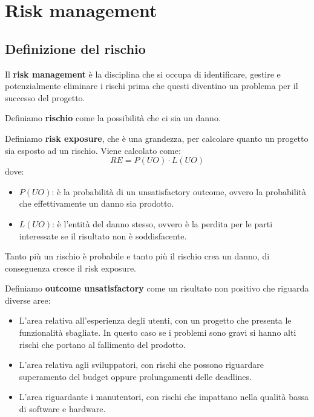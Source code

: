 \chapter{Risk management}
\section{Definizione del rischio}
\begin{definizione}
    Il \textbf{risk management} è la disciplina che si occupa di identificare, gestire e potenzialmente eliminare i rischi prima che questi diventino un problema per il successo del progetto.
\end{definizione}
\begin{definizione}
    Definiamo \textbf{rischio} come la possibilità che ci sia un danno.
\end{definizione}
\begin{definizione}
    Definiamo \textbf{risk exposure}, che è una grandezza, per calcolare quanto un progetto sia esposto ad un rischio. Viene calcolato come:
    \begin{equation}
        RE = P(UO) \cdot L(UO)
    \end{equation}
    dove:
    \begin{itemize}
        \item $P(UO)$: è la probabilità di un unsatisfactory outcome, ovvero la probabilità che effettivamente un danno sia prodotto.
        \item $L(UO)$: è l'entità del danno stesso, ovvero è la perdita per le parti interessate se il risultato non è soddisfacente.
    \end{itemize}
    
    Tanto più un rischio è probabile e tanto più il rischio crea un danno, di conseguenza cresce il risk exposure.
\end{definizione}
\begin{definizione}
    Definiamo \textbf{outcome unsatisfactory} come un risultato non positivo che riguarda diverse aree:
    \begin{itemize}
        \item L'area relativa all'esperienza degli utenti, con un progetto che presenta le funzionalità sbagliate. In questo caso se i problemi sono gravi si hanno alti rischi che portano al fallimento del prodotto.
        \item L'area relativa agli sviluppatori, con rischi che possono riguardare superamento del budget oppure prolungamenti delle deadlines.
        \item L'area riguardante i manutentori, con rischi che impattano nella qualità bassa di software e hardware.
    \end{itemize}
\end{definizione}

